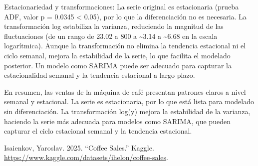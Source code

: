 \documentclass[
]{book}
\newlength{\cslhangindent}
\newenvironment{CSLReferences}[2] %
 {\begin{list}{}{%
  \setlength{\itemindent}{0pt}
  \setlength{\leftmargin}{0pt}
  \setlength{\parsep}{0pt}
  \ifodd #1
   \setlength{\leftmargin}{\cslhangindent}
   \setlength{\itemindent}{-1\cslhangindent}
  \fi
  \setlength{\itemsep}{#2\baselineskip}}}
 {\end{list}}
\begin{document}
Estacionariedad y transformaciones: La serie original es estacionaria
(prueba ADF, valor p = 0.0345 \textless{} 0.05), por lo que la
diferenciación no es necesaria. La transformación log estabiliza la
varianza, reduciendo la magnitud de las fluctuaciones (de un rango de
23.02 a 800 a \textasciitilde3.14 a \textasciitilde6.68 en la escala
logarítmica). Aunque la transformación no elimina la tendencia
estacional ni el ciclo semanal, mejora la estabilidad de la serie, lo
que facilita el modelado posterior. Un modelo como SARIMA puede ser
adecuado para capturar la estacionalidad semanal y la tendencia
estacional a largo plazo.

En resumen, las ventas de la máquina de café presentan patrones claros a
nivel semanal y estacional. La serie es estacionaria, por lo que está
lista para modelado sin diferenciación. La transformación log⁡(y) mejora
la estabilidad de la varianza, haciendo la serie más adecuada para
modelos como SARIMA, que pueden capturar el ciclo estacional semanal y
la tendencia estacional.

\label{refs}
\begin{CSLReferences}{1}{0}
Isaienkov, Yaroslav. 2025. {``Coffee Sales.''} Kaggle.
\url{https://www.kaggle.com/datasets/ihelon/coffee-sales}.

\end{CSLReferences}

\backmatter
\end{document}
